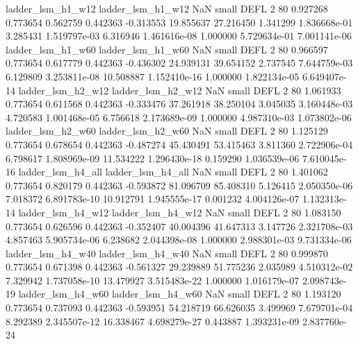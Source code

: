        ladder_lsm_h1_w12        ladder_lsm_h1_w12                   NaN      small     DEFL                 2 80 0.927268       0.773654 0.562759       0.442363   -0.313553     19.855637     27.216450     1.341299   1.836668e-01  3.285431 1.519797e-03     6.316946   1.461616e-08            1.000000    5.729634e-01        7.001141e-06
       ladder_lsm_h1_w60        ladder_lsm_h1_w60                   NaN      small     DEFL                 2 80 0.966597       0.773654 0.617779       0.442363   -0.436302     24.939131     39.654152     2.737545   7.644759e-03  6.129809 3.253811e-08    10.508887   1.152410e-16            1.000000    1.822134e-05        6.649407e-14
       ladder_lsm_h2_w12        ladder_lsm_h2_w12                   NaN      small     DEFL                 2 80 1.061933       0.773654 0.611568       0.442363   -0.333476     37.261918     38.250104     3.045035   3.160448e-03  4.720583 1.001468e-05     6.756618   2.173689e-09            1.000000    4.987310e-03        1.073802e-06
       ladder_lsm_h2_w60        ladder_lsm_h2_w60                   NaN      small     DEFL                 2 80 1.125129       0.773654 0.678654       0.442363   -0.487274     45.430491     53.415463     3.811360   2.722906e-04  6.798617 1.808969e-09    11.534222   1.296430e-18            0.159290    1.036539e-06        7.610045e-16
       ladder_lsm_h4_all        ladder_lsm_h4_all                   NaN      small     DEFL                 2 80 1.401062       0.773654 0.820179       0.442363   -0.593872     81.096709     85.408310     5.126415   2.050350e-06  7.018372 6.891783e-10    10.912791   1.945555e-17            0.001232    4.004126e-07        1.132313e-14
       ladder_lsm_h4_w12        ladder_lsm_h4_w12                   NaN      small     DEFL                 2 80 1.083150       0.773654 0.626596       0.442363   -0.352407     40.004396     41.647313     3.147726   2.321708e-03  4.857463 5.905734e-06     6.238682   2.044398e-08            1.000000    2.988301e-03        9.731334e-06
       ladder_lsm_h4_w40        ladder_lsm_h4_w40                   NaN      small     DEFL                 2 80 0.999870       0.773654 0.671398       0.442363   -0.561327     29.239889     51.775236     2.035989   4.510312e-02  7.329942 1.737058e-10    13.479927   3.515483e-22            1.000000    1.016179e-07        2.098743e-19
       ladder_lsm_h4_w60        ladder_lsm_h4_w60                   NaN      small     DEFL                 2 80 1.193120       0.773654 0.737093       0.442363   -0.593951     54.218719     66.626035     3.499969   7.679701e-04  8.292389 2.345507e-12    16.338467   4.698279e-27            0.443887    1.393231e-09        2.837760e-24
